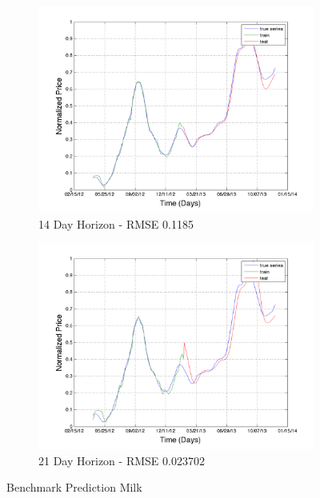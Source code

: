 \begin{figure}
       \hfill
       
        \begin{subfigure}[b]{0.5\textwidth}
                \includegraphics[width=\textwidth]{img/model/milk/model1/pred_14}
                \caption{14 Day Horizon - RMSE 0.1185}
                \label{fig:mouse}
        \end{subfigure}%
         \begin{subfigure}[b]{0.5\textwidth}
                \includegraphics[width=\textwidth]{img/model/milk/model1/pred_21}
                \caption{21 Day Horizon - RMSE 0.023702}
                \label{fig:long_milk_price}
        \end{subfigure}
        \caption{Benchmark Prediction Milk}
        \label{fig:milk_1}
\end{figure}



